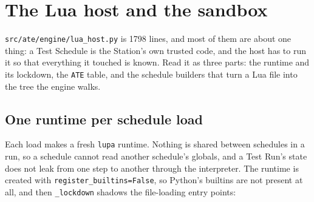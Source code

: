 \chapter{The Lua host and the sandbox}\label{ch:lua}

\texttt{src/\allowbreak{}ate/\allowbreak{}engine/\allowbreak{}lua\_\allowbreak{}host.py} is 1798 lines, and most of them are about one thing: a Test
Schedule is the Station's own trusted code, and the host has to run it so that everything it touched
is known. Read it as
three parts: the runtime and its lockdown, the \texttt{ATE} table, and the schedule builders that turn a
Lua file into the tree the engine walks.

\section{One runtime per schedule load}

Each load makes a fresh \texttt{lupa} runtime. Nothing is shared between schedules in a run, so a
schedule cannot read another schedule's globals, and a Test Run's state does not leak from one step to
another through the interpreter. The runtime is created with \texttt{register\_\allowbreak{}builtins=False}, so
Python's builtins are not present at all, and then \texttt{\_lockdown} shadows the file-loading entry
points:


